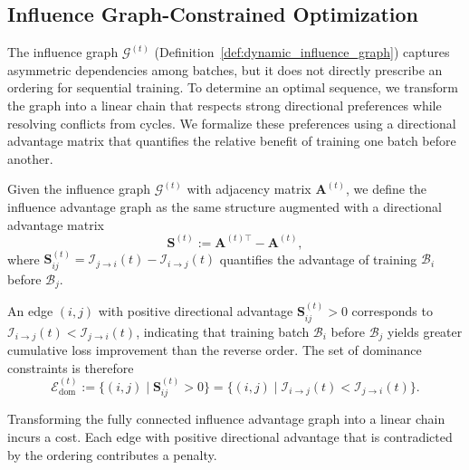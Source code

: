 \subsection{Influence Graph-Constrained Optimization}
\label{sec:influence_optimization}
The influence graph $\mathcal{G}^{(t)}$ (Definition~\ref{def:dynamic_influence_graph}) captures asymmetric dependencies among batches, but it does not directly prescribe an ordering for sequential training. To determine an optimal sequence, we transform the graph into a linear chain that respects strong directional preferences while resolving conflicts from cycles. We formalize these preferences using a directional advantage matrix that quantifies the relative benefit of training one batch before another.

\begin{tcolorbox}[colback=lightpurple, colframe=lightpurple, sharp corners=all, boxrule=0mm, boxsep=0.5mm, left=1.5mm, right=1.5mm, top=1.5mm, bottom=1.5mm]
\begin{definition}
\label{def:influence_advantage_graph}
Given the influence graph $\mathcal{G}^{(t)}$ with adjacency matrix $\mathbf{A}^{(t)}$, 
we define the influence advantage graph as the same structure augmented with a directional advantage matrix 
\[
\mathbf{S}^{(t)} := \mathbf{A}^{(t)\top} - \mathbf{A}^{(t)},
\]
where $\mathbf{S}^{(t)}_{ij} = \mathcal{I}_{j \to i}(t) - \mathcal{I}_{i \to j}(t)$ quantifies the advantage of training $\mathcal{B}_i$ before $\mathcal{B}_j$.
\end{definition}
\end{tcolorbox}

An edge $(i,j)$ with positive directional advantage $\mathbf{S}^{(t)}_{ij} > 0$ corresponds to $\mathcal{I}_{i \to j}(t) < \mathcal{I}_{j \to i}(t)$,
indicating that training batch $\mathcal{B}_i$ before $\mathcal{B}_j$ yields greater cumulative loss improvement than the reverse order.
The set of dominance constraints is therefore
{
\setlength{\abovedisplayskip}{8pt}
\setlength{\belowdisplayskip}{8pt}
\[
\mathcal{E}^{(t)}_{\mathrm{dom}} := \{(i,j) \mid \mathbf{S}^{(t)}_{ij} > 0\} = \{(i,j) \mid \mathcal{I}_{i \to j}(t) < \mathcal{I}_{j \to i}(t)\}.
\]
}

Transforming the fully connected influence advantage graph into a linear chain incurs a cost. Each edge with positive directional advantage that is contradicted by the ordering contributes a penalty. 

